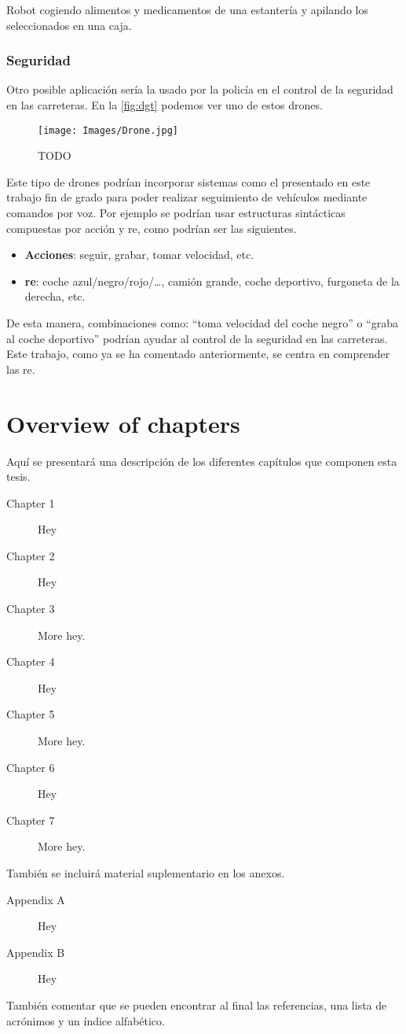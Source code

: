 Robot cogiendo alimentos y medicamentos de una estantería y apilando los
seleccionados en una caja.


\subsubsection{Seguridad}

Otro posible aplicación sería la usado por la policía en el control de la
seguridad en las carreteras. En la \vref{fig:dgt} podemos ver uno de estos
drones.

\begin{figure}[ht]
  \centering
  \texttt{[image: Images/Drone.jpg]}
  \caption[TODO]{TODO}
  \label{fig:dgt}
\end{figure}

Este tipo de drones podrían incorporar sistemas como el presentado en este
trabajo fin de grado para poder realizar seguimiento de vehículos mediante
comandos por voz. Por ejemplo se podrían usar estructuras sintácticas
compuestas por acción y \gls{re}, como podrían ser las siguientes.

\begin{itemize}
  \item \textbf{Acciones}: seguir, grabar, tomar velocidad, etc.
  \item \textbf{\gls*{re}}: coche azul/negro/rojo/\ldots, camión grande, coche
  deportivo, furgoneta de la derecha, etc.
\end{itemize}

De esta manera, combinaciones como: ``toma velocidad del coche negro'' o
``graba al coche deportivo'' podrían ayudar al control de la seguridad en las
carreteras. Este trabajo, como ya se ha comentado anteriormente, se centra en
comprender las \gls{re}.


\section{Overview of chapters}

Aquí se presentará una descripción de los diferentes capítulos que componen
esta tesis.

\begin{description}
  \item[Chapter 1] Hey
  \item[Chapter 2] Hey
  \item[Chapter 3] More hey.
  \item[Chapter 4] Hey
  \item[Chapter 5] More hey.
  \item[Chapter 6] Hey
  \item[Chapter 7] More hey.
\end{description}

También se incluirá material suplementario en los anexos.

\begin{description}
  \item[Appendix A] Hey
  \item[Appendix B] Hey
\end{description}

También comentar que se pueden encontrar al final las referencias, una lista de
acrónimos y un índice alfabético.
